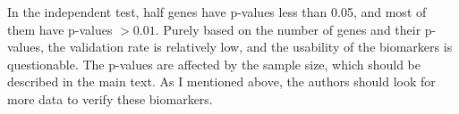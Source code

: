 \documentclass[preprint,12pt]{elsarticle}
\begin{document}
In the independent test, half genes have p-values less than 0.05, and most of them have p-values $> 0.01$. %
Purely based on the number of genes and their p-values, the validation rate is relatively low, and the usability of the biomarkers is questionable. %
The p-values are affected by the sample size, which should be described in the main text. %
As I mentioned above, the authors should look for more data to verify these biomarkers. %
\end{document}
